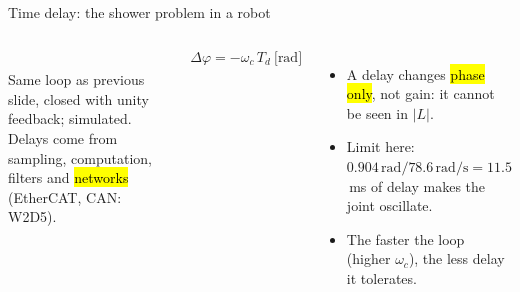 \documentclass[aspectratio=169,10pt]{beamer}
\begin{document}
\begin{frame}{Time delay: the shower problem in a robot}
\begin{columns}[T]
\centering
{}\\
\footnotesize Same loop as previous slide, closed with unity feedback; simulated.
\small
Delays come from sampling, computation, filters and \hl{networks} (EtherCAT, CAN: W2D5).
\begin{eqbox}
\[
\Delta\varphi=-\omega_c\,T_d\ \text{[rad]}
\]
\end{eqbox}
\footnotesize
\begin{itemize}
  \item A delay changes \hl{phase only}, not gain: it cannot be seen in $|L|$.
  \item Limit here: $0.904\,\mathrm{rad}/78.6\,\mathrm{rad/s}=11.5$\,ms of delay makes the joint oscillate.
  \item The faster the loop (higher $\omega_c$), the less delay it tolerates.
\end{itemize}
\end{columns}
\end{frame}
\end{document}

